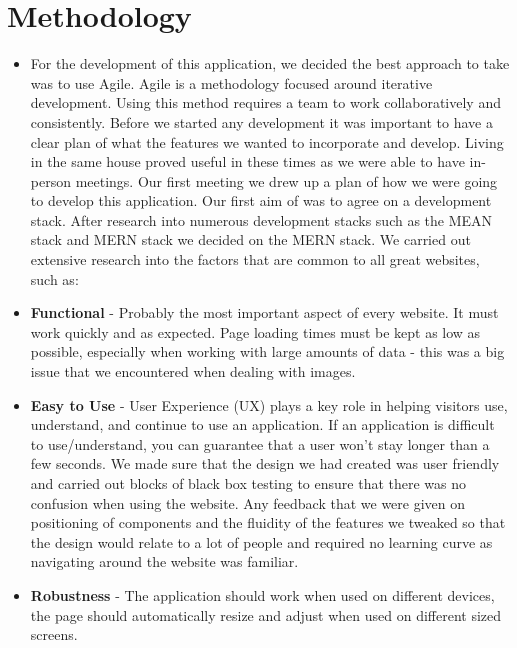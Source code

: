 \chapter{Methodology}
\begin{itemize}
\item 


For the development of this application, we decided the best approach to take was to use Agile. Agile is a methodology focused around iterative development. Using this method requires a team to work collaboratively and consistently. Before we started any development it was important to have a clear plan of what the features we wanted to incorporate and develop. Living in the same house proved useful in these times as we were able to have in-person meetings. Our first meeting we drew up a plan of how we were going to develop this application. Our first aim of was to agree on a development stack. After research into numerous development stacks such as the MEAN stack and MERN stack we decided on the MERN stack. We carried out extensive research into the factors that are common to all great websites, such as:

\item \textbf{Functional} - Probably the most important aspect of every website. It must work quickly and as expected. Page loading times must be kept as low as possible, especially when working with large amounts of data - this was a big issue that we encountered when dealing with images.
\item \textbf{Easy to Use} - User Experience (UX) plays a key role in helping visitors use, understand, and continue to use an application. If an application is difficult to use/understand, you can guarantee that a user won't stay longer than a few seconds. We made sure that the design we had created was user friendly and carried out blocks of black box testing to ensure that there was no confusion when using the website. Any feedback that we were given on positioning of components and the fluidity of the features we tweaked so that the design would relate to a lot of people and required no learning curve as navigating around the website was familiar.
\item \textbf{Robustness} - The application should work when used on different devices, the page should automatically resize and adjust when used on different sized screens.


\end{itemize}
